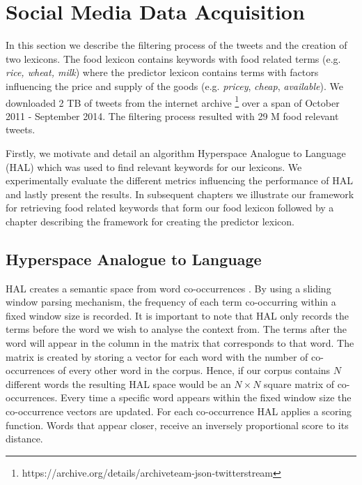 

\let\cleardoublepage\clearpage

\chapter{Social Media Data Acquisition}
In this section we describe the filtering process of the tweets and the creation of two lexicons. The food lexicon contains keywords with food related terms (e.g. \emph {rice, wheat, milk}) where the predictor lexicon contains terms with factors influencing the price and supply of the goods (e.g. \emph{pricey}, \emph {cheap}, \emph{available}). We downloaded 2 TB of tweets from the internet archive \footnote{https://archive.org/details/archiveteam-json-twitterstream} over a span of October 2011 - September 2014.  The filtering process resulted with 29 M food relevant tweets.

Firstly, we motivate and detail an algorithm Hyperspace Analogue to Language (HAL)  \cite{lund96} which was used to find relevant keywords for our lexicons. We experimentally evaluate the  different metrics influencing the performance of HAL and lastly present the results. In subsequent chapters we illustrate our framework for retrieving food related keywords that form our food lexicon followed by a chapter describing the framework for creating the predictor lexicon. 


\section{Hyperspace Analogue to Language}

HAL creates a semantic space from word co-occurrences \cite{lund96}. By using a sliding window parsing mechanism, the frequency of each term co-occurring within a fixed window size is recorded.  It is important to note that HAL only records the terms before the word we wish to analyse the context from. The terms after the word will appear in the column in the matrix that corresponds to that word.  The matrix is created by storing a vector for each word with the number of co-occurrences of every other word in the corpus. Hence, if our corpus contains $N$ different words the resulting HAL space would be an $N \times N$ square matrix of co-occurrences. Every time a specific word appears within the fixed window size the co-occurrence vectors are updated. For each co-occurrence HAL applies a scoring function. Words that appear closer, receive an inversely proportional score to its distance.

